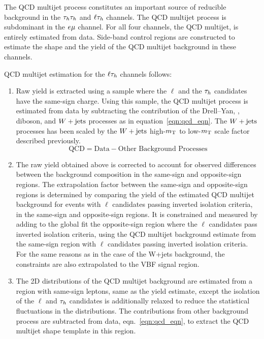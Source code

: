 The QCD multijet process constitutes an important source of reducible background 
in the $\tau_{h}\tau_{h}$ and $\ell\tau_{h}$ channels. The QCD multijet process is subdominant
in the $e\mu$ channel. For all four channels, the QCD multijet, is entirely estimated from data.  
Side-band control regions are constructed to estimate the shape and the yield of the QCD multijet 
background in these channels.

QCD multijet estimation for the $\ell\tau_{h}$ channels follows:
\begin{enumerate}

\item Raw yield is extracted using a sample where the
$\ell$ and the $\tau_{h}$ candidates have the same-sign charge. Using this sample, the QCD multijet 
process is estimated from data by subtracting the contribution of the Drell--Yan, \ttbar, diboson,
and $W+\text{jets}$ processes as in equation~\ref{eqn:qcd_eqn}. The $W+\text{jets}$ processes has been scaled by the
$W+\text{jets}$ high-$m_\mathrm{T}$ to low-$m_\mathrm{T}$ scale factor described previously.
\begin{equation}
\label{eqn:qcd_eqn}
\text{QCD} = \text{Data} - \text{Other Background Processes}
\end{equation}

\item The raw yield obtained above is corrected to account for observed differences between the background 
composition in the same-sign and opposite-sign regions. The extrapolation factor between the same-sign 
and opposite-sign regions is determined by comparing the yield of the estimated QCD multijet background for 
events with $\ell$ candidates passing inverted isolation criteria, in the same-sign and opposite-sign 
regions. It is constrained and measured by adding to the global fit the opposite-sign region where 
the $\ell$ candidates pass inverted isolation criteria, using the QCD multijet background estimate 
from the same-sign region with $\ell$ candidates passing inverted isolation criteria. For the same 
reasons as in the case of the W+jets background, the constraints are also extrapolated to the VBF 
signal region. 

\item The 2D distributions of the QCD multijet background are estimated from a region with 
same-sign leptons, same as the yield estimate, except the isolation of the $\ell$ and $\tau_{h}$ 
candidates is additionally relaxed to reduce the statistical fluctuations in the distributions. 
The contributions from other background process are subtracted from data, eqn.~\ref{eqn:qcd_eqn},
to extract the QCD multijet shape template in this region.
\end{enumerate}

